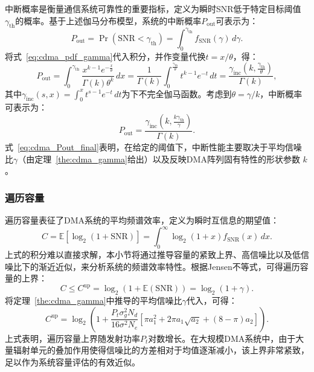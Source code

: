 中断概率是衡量通信系统可靠性的重要指标，定义为瞬时SNR低于特定目标阈值$\gamma_{\text{th}}$的概率。基于上述伽马分布模型，系统的中断概率$P_{\text{out}}$可表示为：
\begin{equation}
	P_{\text{out}}= \operatorname{Pr}(\mathrm{SNR} < \gamma_{\text{th}}) = \int_{0}^{\gamma_{\text{th}}} f_{\mathrm{SNR}}(\gamma)\, d\gamma.
\end{equation}
将式~\eqref{eq:cdma_pdf_gamma}代入积分，并作变量代换$t = x/\theta$，得：
\begin{equation}
	P_{\text{out}} 
	= \int_{0}^{\gamma_{\text{th}}} \frac{x^{k-1} e^{-\frac{x}{\theta}}}{\Gamma(k) \theta^k} \, dx
	= \frac{1}{\Gamma(k)} \int_{0}^{\frac{\gamma_{\text{th}}}{\theta}} t^{k-1} e^{-t}\, dt 
	= \frac{\gamma_{\text{inc}}\left(k, \frac{\gamma_{\text{th}}}{\theta}\right)}{\Gamma(k)},
\end{equation}
其中$\gamma_{\text{inc}}(s, x) = \int_0^x t^{s-1} e^{-t}\, dt$为下不完全伽马函数。考虑到$\theta = \gamma / k$，中断概率可表示为：
\begin{equation}\label{eq:cdma_Pout_final}
	P_{\text{out}} = \frac{\gamma_{\text{inc}}\left(k, \frac{k \gamma_{\text{th}}}{\gamma}\right)}{\Gamma(k)}.
\end{equation}
式~\eqref{eq:cdma_Pout_final}表明，在给定的阈值下，中断性能主要取决于平均信噪比$\gamma$（由定理~\ref{the:cdma_gamma}给出）以及反映DMA阵列固有特性的形状参数 $k$。

\subsubsection{遍历容量}

遍历容量表征了DMA系统的平均频谱效率，定义为瞬时互信息的期望值：
\begin{equation}\label{eq:cdma_capacity_def}
	C = \mathbb{E}\left[ \log_2(1 + \mathrm{SNR}) \right] = \int_{0}^{\infty} \log_2(1 + x) f_{\mathrm{SNR}}(x)\, dx.
\end{equation}
上式的积分难以直接求解，本小节将通过推导容量的紧致上界、高信噪比以及低信噪比下的渐近近似，来分析系统的频谱效率特性。根据Jensen不等式，可得遍历容量的上界：
\begin{equation}
	C \leq C^{\text{up}} = \log_2\left( 1 + \mathbb{E}(\mathrm{SNR}) \right) = \log_2(1 + \gamma).
\end{equation}
将定理~\ref{the:cdma_gamma}中推导的平均信噪比$\gamma$代入，可得：
\begin{equation}
	\label{eq:cdma_capacity_upper}C^{\text{up}} = \log_2\left( 1 + \frac{P_{t}\sigma_g^2 N_d}{16\sigma^2 N_e}\left[\pi a_1^2 + 2\pi a_1\sqrt{a_2} + (8-\pi) a_2\right] \right).
\end{equation}
上式表明，遍历容量上界随发射功率$P_t$对数增长。在大规模DMA系统中，由于大量辐射单元的叠加作用使得信噪比的方差相对于均值逐渐减小，该上界非常紧致，足以作为系统容量评估的有效近似。

